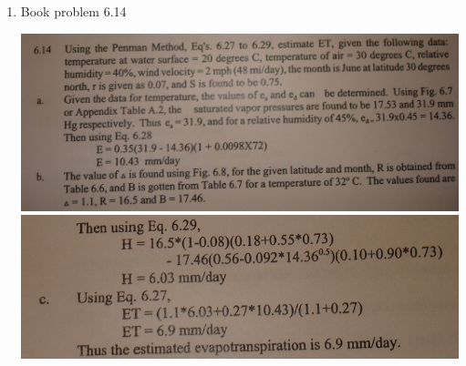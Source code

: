 \documentclass[11pt]{article}
\begin{document}
\begin{enumerate}
\item Book problem 6.14

\includegraphics[width=\textwidth]{6-14a}
\includegraphics[width=\textwidth]{6-14b}

\end{enumerate}
\end{document}
